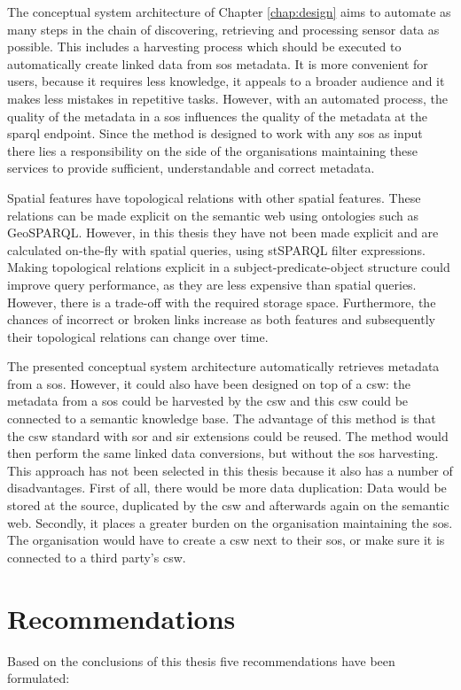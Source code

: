 The conceptual system architecture of Chapter \ref{chap:design} aims to automate as many steps in the chain of discovering, retrieving and processing sensor data as possible. This includes a harvesting process which should be executed to automatically create linked data from \ac{sos} metadata. It is more convenient for users, because it requires less knowledge, it appeals to a broader audience and it makes less mistakes in repetitive tasks. However, with an automated process, the quality of the metadata in a \ac{sos} influences the quality of the metadata at the \ac{sparql} endpoint. Since the method is designed to work with any \ac{sos} as input there lies a responsibility on the side of the organisations maintaining these services to provide sufficient, understandable and correct metadata.   

Spatial features have topological relations with other spatial features. These relations can be made explicit on the semantic web using ontologies such as GeoSPARQL. However, in this thesis they have not been made explicit and are calculated on-the-fly with spatial queries, using stSPARQL filter expressions. Making topological relations explicit in a subject-predicate-object structure could improve query performance, as they are less expensive than spatial queries. However, there is a trade-off with the required storage space. Furthermore, the chances of incorrect or broken links increase as both features and subsequently their topological relations can change over time. 

The presented conceptual system architecture automatically retrieves metadata from a \ac{sos}. However, it could also have been designed on top of a \ac{csw}: the metadata from a \ac{sos} could be harvested by the \ac{csw} and this \ac{csw} could be connected to a semantic knowledge base. The advantage of this method is that the \ac{csw} standard with \acs{sor} and \acs{sir} extensions could be reused. The method would then perform the same linked data conversions, but without the \ac{sos} harvesting. This approach has not been selected in this thesis because it also has a number of disadvantages. First of all, there would be more data duplication: Data would be stored at the source, duplicated by the \ac{csw} and afterwards again on the semantic web. Secondly, it places a greater burden on the organisation maintaining the \ac{sos}. The organisation would have to create a \ac{csw} next to their \ac{sos}, or make sure it is connected to a third party's \ac{csw}.  

\section{Recommendations}
\label{recommend}
Based on the conclusions of this thesis five recommendations have been formulated: 


